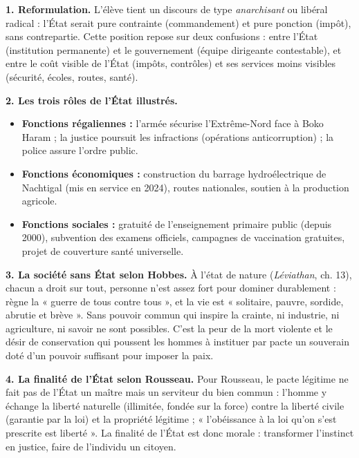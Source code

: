 \documentclass[11pt]{article}
\newcommand{\cle}[1]{{\popxbold\color{popdark}#1}}
\begin{document}
\begin{corrige}

\textbf{1. Reformulation.} L'élève tient un discours de type \emph{anarchisant} ou libéral radical : l'État serait pure contrainte (commandement) et pure ponction (impôt), sans contrepartie. Cette position repose sur deux confusions : entre l'État (institution permanente) et le gouvernement (équipe dirigeante contestable), et entre le coût visible de l'État (impôts, contrôles) et ses services moins visibles (sécurité, écoles, routes, santé).

\textbf{2. Les trois rôles de l'État illustrés.}
\begin{itemize}
\item \textbf{Fonctions régaliennes :} l'armée sécurise l'Extrême-Nord face à Boko Haram ; la justice poursuit les infractions (opérations anticorruption) ; la police assure l'ordre public.
\item \textbf{Fonctions économiques :} construction du barrage hydroélectrique de Nachtigal (mis en service en 2024), routes nationales, soutien à la production agricole.
\item \textbf{Fonctions sociales :} gratuité de l'enseignement primaire public (depuis 2000), subvention des examens officiels, campagnes de vaccination gratuites, projet de couverture santé universelle.
\end{itemize}

\textbf{3. La société sans État selon Hobbes.} À l'\cle{état de nature} (\emph{Léviathan}, ch. 13), chacun a droit sur tout, personne n'est assez fort pour dominer durablement : règne la « guerre de tous contre tous », et la vie est « solitaire, pauvre, sordide, abrutie et brève ». Sans pouvoir commun qui inspire la crainte, ni industrie, ni agriculture, ni savoir ne sont possibles. C'est la peur de la mort violente et le désir de conservation qui poussent les hommes à instituer par pacte un souverain doté d'un pouvoir suffisant pour imposer la paix.

\textbf{4. La finalité de l'État selon Rousseau.} Pour Rousseau, le pacte légitime ne fait pas de l'État un maître mais un serviteur du \cle{bien commun} : l'homme y échange la liberté naturelle (illimitée, fondée sur la force) contre la liberté civile (garantie par la loi) et la propriété légitime ; « l'obéissance à la loi qu'on s'est prescrite est liberté ». La finalité de l'État est donc morale : transformer l'instinct en justice, faire de l'individu un citoyen.


\end{corrige}
\end{document}
